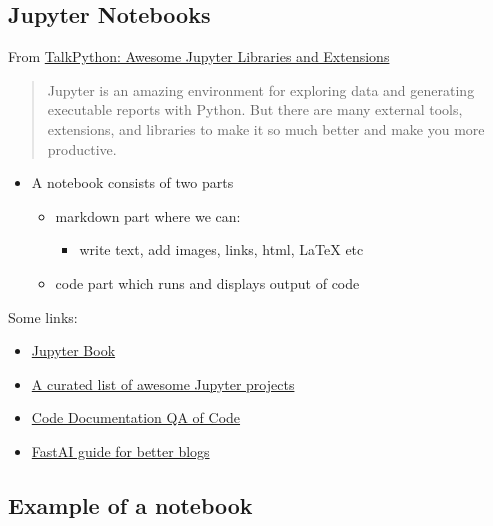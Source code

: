 \documentclass[
  letterpaper,
  DIV=11,
  numbers=noendperiod]{scrartcl}
\providecommand{\tightlist}{%
  \setlength{\itemsep}{0pt}\setlength{\parskip}{0pt}}\usepackage{longtable,booktabs,array}
\begin{document}
\hypertarget{jupyter-notebooks}{%
\subsection{Jupyter Notebooks}\label{jupyter-notebooks}}

From
\href{https://talkpython.fm/episodes/show/394/awesome-jupyter-libraries-and-extensions-in-2022}{TalkPython:
Awesome Jupyter Libraries and Extensions}

\begin{quote}
Jupyter is an amazing environment for exploring data and generating
executable reports with Python. But there are many external tools,
extensions, and libraries to make it so much better and make you more
productive.
\end{quote}

\begin{itemize}
\tightlist
\item
  A notebook consists of two parts

  \begin{itemize}
  \tightlist
  \item
    markdown part where we can:

    \begin{itemize}
    \tightlist
    \item
      write text, add images, links, html, LaTeX etc
    \end{itemize}
  \item
    code part which runs and displays output of code
  \end{itemize}
\end{itemize}

Some links:

\begin{itemize}
\tightlist
\item
  \href{https://jupyterbook.org/en/stable/intro.html}{Jupyter Book}
\item
  \href{https://github.com/markusschanta/awesome-jupyter}{A curated list
  of awesome Jupyter projects}
\item
  \href{https://best-practice-and-impact.github.io/qa-of-code-guidance/code_documentation.html\#generating-html-documentation}{Code
  Documentation QA of Code}
\item
  \href{https://www.fast.ai/posts/2019-05-13-blogging-advice.html}{FastAI
  guide for better blogs}
\end{itemize}

\hypertarget{example-of-a-notebook}{%
\subsection{Example of a notebook}\label{example-of-a-notebook}}
\end{document}
